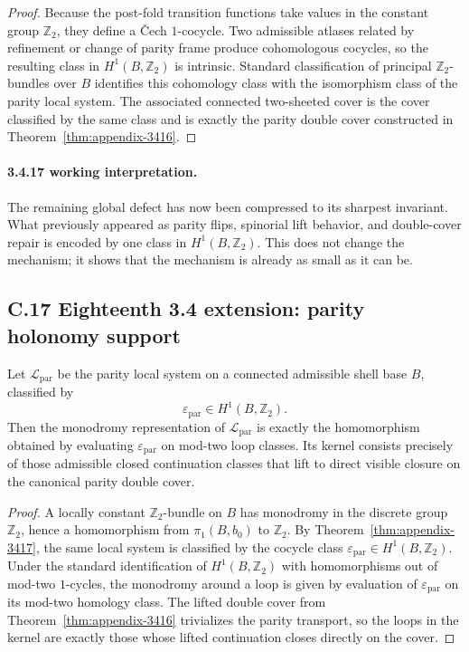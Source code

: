 \begin{proof}
Because the post-fold transition functions take values in the constant group $\mathbb Z_2$, they define a \v{C}ech $1$-cocycle. Two admissible atlases related by refinement or change of parity frame produce cohomologous cocycles, so the resulting class in $H^1(B,\mathbb Z_2)$ is intrinsic. Standard classification of principal $\mathbb Z_2$-bundles over $B$ identifies this cohomology class with the isomorphism class of the parity local system. The associated connected two-sheeted cover is the cover classified by the same class and is exactly the parity double cover constructed in Theorem~\ref{thm:appendix-3416}.
\end{proof}

\paragraph{3.4.17 working interpretation.}
The remaining global defect has now been compressed to its sharpest invariant. What previously appeared as parity flips, spinorial lift behavior, and double-cover repair is encoded by one class in $H^1(B,\mathbb Z_2)$. This does not change the mechanism; it shows that the mechanism is already as small as it can be.


\subsection*{C.17 Eighteenth 3.4 extension: parity holonomy support}

\begin{theorem}
\label{thm:appendix-3418}
Let $\mathcal L_{\mathrm{par}}$ be the parity local system on a connected admissible shell base $B$, classified by
\[
  \varepsilon_{\mathrm{par}}\in H^1(B,\mathbb Z_2).
\]
Then the monodromy representation of $\mathcal L_{\mathrm{par}}$ is exactly the homomorphism obtained by evaluating $\varepsilon_{\mathrm{par}}$ on mod-two loop classes. Its kernel consists precisely of those admissible closed continuation classes that lift to direct visible closure on the canonical parity double cover.
\end{theorem}

\begin{proof}
A locally constant $\mathbb Z_2$-bundle on $B$ has monodromy in the discrete group $\mathbb Z_2$, hence a homomorphism from $\pi_1(B,b_0)$ to $\mathbb Z_2$. By Theorem~\ref{thm:appendix-3417}, the same local system is classified by the cocycle class $\varepsilon_{\mathrm{par}}\in H^1(B,\mathbb Z_2)$. Under the standard identification of $H^1(B,\mathbb Z_2)$ with homomorphisms out of mod-two $1$-cycles, the monodromy around a loop is given by evaluation of $\varepsilon_{\mathrm{par}}$ on its mod-two homology class. The lifted double cover from Theorem~\ref{thm:appendix-3416} trivializes the parity transport, so the loops in the kernel are exactly those whose lifted continuation closes directly on the cover.
\end{proof}

